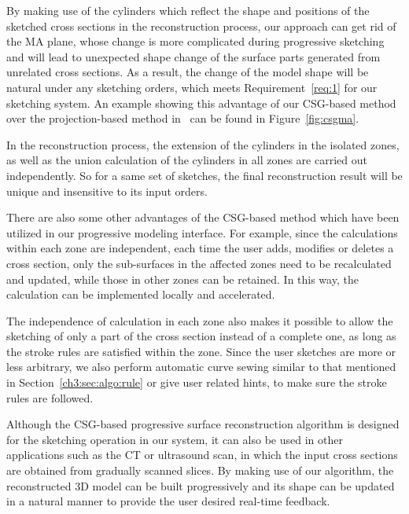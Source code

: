 By making use of the cylinders which reflect the shape and
positions of the sketched cross sections in the reconstruction
process, our approach can get rid of the MA plane, whose change is
more complicated during progressive sketching and will lead to
unexpected shape change of the surface parts generated from
unrelated cross sections. As a result, the change of the model shape
will be natural under any sketching orders, which meets
Requirement~\ref{req:1} for our sketching system. An example showing
this advantage of our CSG-based method over the projection-based
method in~\cite{LBDLJ08} can be found in Figure~\ref{fig:csgma}.

In the reconstruction process, the extension of the cylinders in
the isolated zones, as well as the union calculation of the
cylinders in all zones are carried out independently. So for a same
set of sketches, the final reconstruction result will be unique and
insensitive to its input orders.

There are also some other advantages of the  CSG-based method which
have been utilized in our progressive modeling interface. For
example, since the calculations within each zone are independent,
each time the user adds, modifies or deletes a cross section, only
the sub-surfaces in the affected zones need to be recalculated and
updated, while those in other zones can be retained. In this way,
the calculation can be implemented locally and accelerated.

The independence of calculation in each zone also makes it possible
to allow the sketching of only a part of the cross section instead
of a complete one, as long as the stroke rules are satisfied within
the zone. Since the user sketches are more or less arbitrary, we
also perform automatic curve sewing similar to that mentioned in
Section~\ref{ch3:sec:algo:rule} or give user related hints, to make
sure the stroke rules are followed.

Although the CSG-based progressive surface reconstruction  algorithm
is designed for the sketching operation in our system, it can also
be used in other applications such as the CT or ultrasound scan, in
which the input cross sections are obtained from gradually scanned
slices. By making use of our algorithm, the reconstructed 3D model
can be built progressively and its shape can be updated in a natural
manner to provide the user desired real-time feedback.
